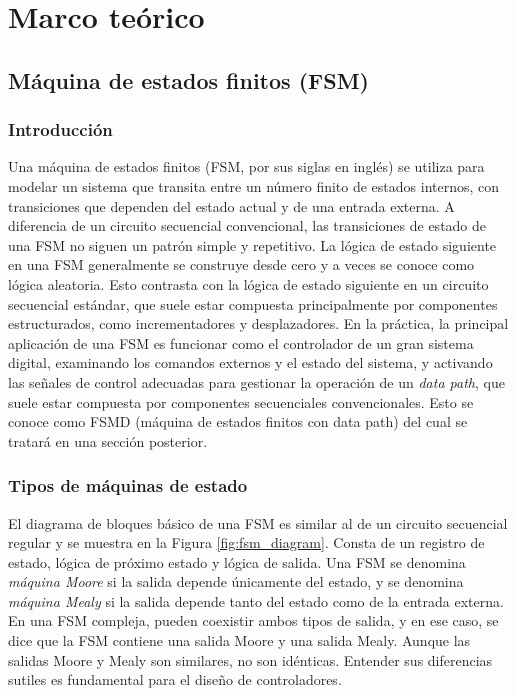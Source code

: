 \chapter{Marco teórico}

  \section{Máquina de estados finitos (FSM)}

    \subsection{Introducción}

    Una máquina de estados finitos (FSM, por sus siglas en inglés) se utiliza para modelar un sistema que transita entre un número finito de estados internos, con transiciones que dependen del estado actual y de una entrada externa. A diferencia de un circuito secuencial convencional, las transiciones de estado de una FSM no siguen un patrón simple y repetitivo. La lógica de estado siguiente en una FSM generalmente se construye desde cero y a veces se conoce como lógica aleatoria. Esto contrasta con la lógica de estado siguiente en un circuito secuencial estándar, que suele estar compuesta principalmente por componentes estructurados, como incrementadores y desplazadores. En la práctica, la principal aplicación de una FSM es funcionar como el controlador de un gran sistema digital, examinando los comandos externos y el estado del sistema, y activando las señales de control adecuadas para gestionar la operación de un \textit{data path}, que suele estar compuesta por componentes secuenciales convencionales. Esto se conoce como FSMD (máquina de estados finitos con data path) del cual se tratará en una sección posterior.

    \subsection{Tipos de máquinas de estado}

    El diagrama de bloques básico de una FSM es similar al de un circuito secuencial regular y se muestra en la Figura \ref{fig:fsm_diagram}. Consta de un registro de estado, lógica de próximo estado y lógica de salida. Una FSM se denomina \textit{máquina Moore} si la salida depende únicamente del estado, y se denomina \textit{máquina Mealy} si la salida depende tanto del estado como de la entrada externa. En una FSM compleja, pueden coexistir ambos tipos de salida, y en ese caso, se dice que la FSM contiene una salida Moore y una salida Mealy. Aunque las salidas Moore y Mealy son similares, no son idénticas. Entender sus diferencias sutiles es fundamental para el diseño de controladores.

